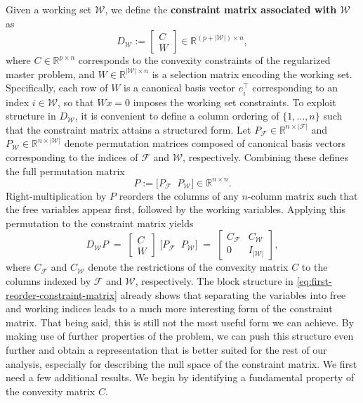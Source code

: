 \documentclass{book}
\theoremstyle{definition}
\numberwithin{algorithm_}{chapter}
\begin{document}
Given a working set $\mathcal{W}$, we define the \textbf{constraint matrix associated with $\mathbf{\mathcal{W}}$} as
\begin{equation}
D_{\mathcal{W}} := 
\begin{bmatrix}
C \\
W
\end{bmatrix} 
\in \mathbb{R}^{(p + |\mathcal{W}|) \times n},
\end{equation}
where $C \in \mathbb{R}^{p \times n}$ corresponds to the convexity constraints of the regularized master problem, and $W \in \mathbb{R}^{|\mathcal{W}| \times n}$ is a selection matrix encoding the working set. Specifically, each row of $W$ is a canonical basis vector $e_i^\top$ corresponding to an index $i \in \mathcal{W}$, so that $W x = 0$ imposes the working set constraints.
To exploit structure in $D_{\mathcal{W}}$, it is convenient to define a column ordering of $\{1, \dots, n\}$ such that the constraint matrix attains a structured form. Let $P_{\mathcal{F}} \in \mathbb{R}^{n \times |\mathcal{F}|}$ and $P_{\mathcal{W}} \in \mathbb{R}^{n \times |\mathcal{W}|}$ denote permutation matrices composed of canonical basis vectors corresponding to the indices of $\mathcal{F}$ and $\mathcal{W}$, respectively. Combining these defines the full permutation matrix
\begin{equation} \label{eq:definition_P}
P := \bigl[ P_{\mathcal{F}} \;\; P_{\mathcal{W}} \bigr] \in \mathbb{R}^{n \times n}.
\end{equation}
Right-multiplication by $P$ reorders the columns of any $n$-column matrix such that the free variables appear first, followed by the working variables. Applying this permutation to the constraint matrix yields
\begin{equation} \label{eq:first-reorder-constraint-matrix}
D_{\mathcal{W}} P
\; = \; 
\begin{bmatrix}
C \\
W
\end{bmatrix} 
\; 
\bigl[ P_{\mathcal{F}} \;\; P_{\mathcal{W}} \bigr]
\; = \;
\begin{bmatrix}
C_\mathcal{F} & C_\mathcal{W} \\[0.6em]
0 & I_{|\mathcal{W}|}
\end{bmatrix},
\end{equation}
where $C_\mathcal{F}$ and $C_\mathcal{W}$ denote the restrictions of the convexity matrix $C$ to the columns indexed by $\mathcal{F}$ and $\mathcal{W}$, respectively. The block structure in \eqref{eq:first-reorder-constraint-matrix} already shows that separating the variables into free and working indices leads to a much more interesting form of the constraint matrix. That being said, this is still not the most useful form we can achieve. By making use of further properties of the problem, we can push this structure even further and obtain a representation that is better suited for the rest of our analysis, especially for describing the null space of the constraint matrix. We first need a few additional results. We begin by identifying a fundamental property of the convexity matrix $C$.
\end{document}
